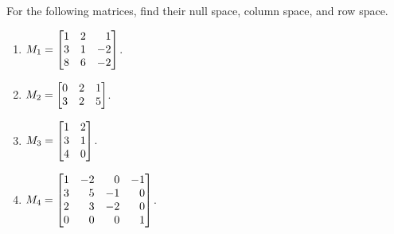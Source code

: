 \begin{exercises}
	\begin{problist}
		\prob For the following matrices, find their null space, column space,
		and row space.
		\begin{enumerate}
			\item $M_{1}=\mat{1&2&1\\3&1&-2\\8&6&-2}$.

			\item $M_{2}=\mat{0&2&1\\3&2&5}$.

			\item $M_{3}=\mat{1&2\\3&1\\4&0}$.

			\item $M_{4}=\mat{1&-2&0&-1\\3&5&-1&0\\2&3&-2&0\\0&0&0&1}$.
		\end{enumerate}


\end{problist}
\end{exercises}

